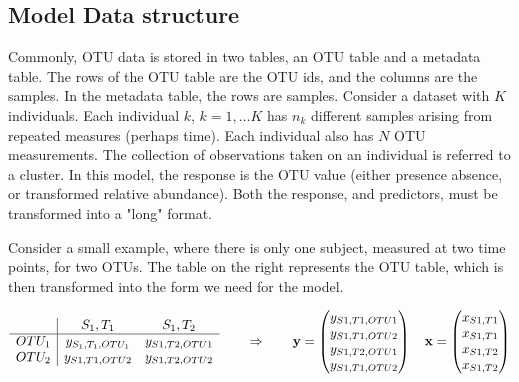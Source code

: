 \documentclass[12pt]{article}
\begin{document}
\subsection{Model Data structure}
Commonly, OTU data is stored in two tables, an OTU table and a metadata table. The rows of the OTU table are the OTU ids, and the columns are the samples. In the metadata table, the rows are samples. Consider a dataset with $K$ individuals. Each individual $k$, $k = 1, \ldots K$ has $n_k$ different samples arising from repeated measures (perhaps time). Each individual also has $N$ OTU measurements.  The collection of observations taken on an individual is referred to a cluster. In this model, the response is the OTU value (either presence absence, or transformed relative abundance). Both the response, and predictors, must be transformed into a "long" format.




Consider a small example, where there is only one subject, measured at two time points, for two OTUs. The table on the right represents the OTU table, which is then transformed into the form we need for the model.

$$
\begin{array}{c| c c}
  & S_1,T_1 & S_1,T_2\\
  \hline
  OTU_1 & y_{S_1,T_1,OTU_1} & y_{S1,T2,OTU1}\\
  OTU_2 & y_{S1,T1,OTU2} & y_{S1,T2,OTU2}\\
\end{array}
\qquad \Rightarrow \qquad
\mathbf{y} = \begin{pmatrix}
    y_{S1,T1,OTU1}\\
    y_{S1,T1,OTU2}\\
    y_ {S1,T2,OTU1}\\
    y_{S1,T1,OTU2}
\end{pmatrix} \quad
\mathbf{x} = \begin{pmatrix}
      x_{S1,T1}\\
      x_{S1,T1}\\
      x_{S1,T2}\\
      x_{S1,T2}
\end{pmatrix}
$$
\end{document}

